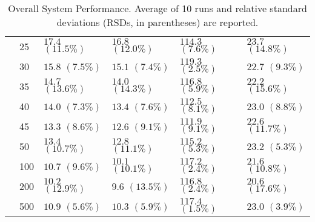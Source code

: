\begin{table}[h]
{\begin{tabular}{|P{3.5em}|P{1.8em}|P{5em}|P{5em}|P{5em}|P{5em}|}
&25	&$17.4$ $(11.5\%)$	&$16.8$ $(12.0\%)$	&$114.3$ $(7.6\%)$	&$23.7$ $(14.8\%)$\\
&30	&$15.8$ $(7.5\%)$	&$15.1$ $(7.4\%)$	&$119.3$ $(2.5\%)$	&$22.7$ $(9.3\%)$\\
&35	&$14.7$ $(13.6\%)$	&$14.0$ $(14.3\%)$	&$116.8$ $(5.9\%)$	&$22.2$ $(15.6\%)$\\
&40	&$14.0$ $(7.3\%)$	&$13.4$ $(7.6\%)$	&$112.5$ $(8.1\%)$	&$23.0$ $(8.8\%)$\\
&45	&$13.3$ $(8.6\%)$	&$12.6$ $(9.1\%)$	&$111.9$ $(9.1\%)$	&$22.6$ $(11.7\%)$\\
&50	&$13.4$ $(10.7\%)$	&$12.8$ $(11.1\%)$	&$115.2$ $(5.3\%)$	&$23.2$ $(5.3\%)$\\
&100	&$10.7$ $(9.6\%)$	&$10.1$ $(10.1\%)$	&$117.2$ $(2.4\%)$	&$21.6$ $(10.8\%)$\\
&200	&$10.2$ $(12.9\%)$	&$9.6$ $(13.5\%)$	&$116.8$ $(2.4\%)$	&$20.6$ $(17.6\%)$\\
&500	&$10.9$ $(5.6\%)$	&$10.3$ $(5.9\%)$	&$117.4$ $(1.5\%)$	&$23.0$ $(3.9\%)$\\
\end{tabular}
}
\caption{ Overall System Performance. Average of 10 runs and relative standard deviations (RSDs, in parentheses) are reported. 
}
\label{tab:all}
\end{table}





